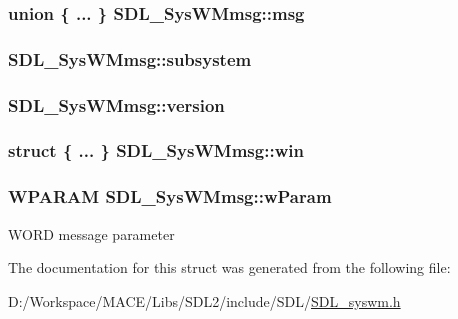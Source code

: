 \subsubsection[{\texorpdfstring{msg}{msg}}]{\setlength{\rightskip}{0pt plus 5cm}union \{ ... \}   S\+D\+L\+\_\+\+Sys\+W\+Mmsg\+::msg}\hypertarget{struct_s_d_l___sys_w_mmsg_a8890abd547a386afa3a822f15568c162}{}\label{struct_s_d_l___sys_w_mmsg_a8890abd547a386afa3a822f15568c162}
\subsubsection[{\texorpdfstring{subsystem}{subsystem}}]{ S\+D\+L\+\_\+\+Sys\+W\+Mmsg\+::subsystem}\hypertarget{struct_s_d_l___sys_w_mmsg_a7c3900af5ea797f1318fc77ee0ecd11b}{}\label{struct_s_d_l___sys_w_mmsg_a7c3900af5ea797f1318fc77ee0ecd11b}
\subsubsection[{\texorpdfstring{version}{version}}]{ S\+D\+L\+\_\+\+Sys\+W\+Mmsg\+::version}\hypertarget{struct_s_d_l___sys_w_mmsg_a95f9aae58d18ee8fac556416b322a5fb}{}\label{struct_s_d_l___sys_w_mmsg_a95f9aae58d18ee8fac556416b322a5fb}
\subsubsection[{\texorpdfstring{win}{win}}]{\setlength{\rightskip}{0pt plus 5cm}struct \{ ... \}   S\+D\+L\+\_\+\+Sys\+W\+Mmsg\+::win}\hypertarget{struct_s_d_l___sys_w_mmsg_a4a2c604644a582e72fa86bca36b1b808}{}\label{struct_s_d_l___sys_w_mmsg_a4a2c604644a582e72fa86bca36b1b808}
\subsubsection[{\texorpdfstring{w\+Param}{wParam}}]{\setlength{\rightskip}{0pt plus 5cm}W\+P\+A\+R\+AM S\+D\+L\+\_\+\+Sys\+W\+Mmsg\+::w\+Param}\hypertarget{struct_s_d_l___sys_w_mmsg_a7463730478d90ebc031d83098f3f74fc}{}\label{struct_s_d_l___sys_w_mmsg_a7463730478d90ebc031d83098f3f74fc}
W\+O\+RD message parameter 

The documentation for this struct was generated from the following file\+:\begin{DoxyCompactItemize}
\item 
D\+:/\+Workspace/\+M\+A\+C\+E/\+Libs/\+S\+D\+L2/include/\+S\+D\+L/\hyperlink{_s_d_l__syswm_8h}{S\+D\+L\+\_\+syswm.\+h}\end{DoxyCompactItemize}
